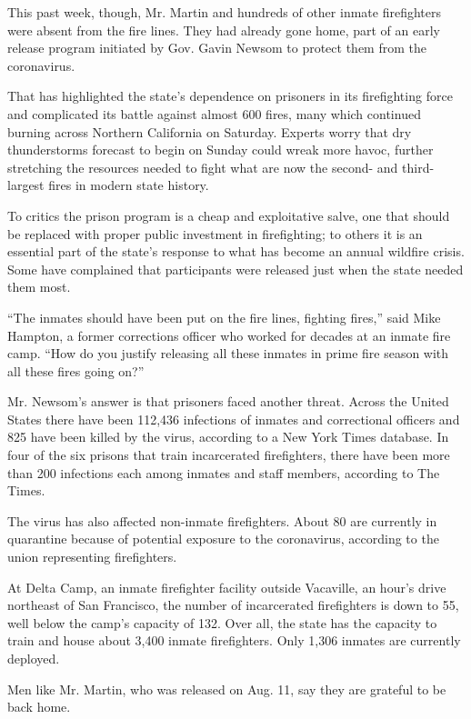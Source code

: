 This past week, though, Mr. Martin and hundreds of other inmate
firefighters were absent from the fire lines. They had already gone
home, part of an early release program initiated by Gov. Gavin Newsom to
protect them from the coronavirus.

That has highlighted the state's dependence on prisoners in its
firefighting force and complicated its battle against almost 600 fires,
many which continued burning across Northern California on Saturday.
Experts worry that dry thunderstorms forecast to begin on Sunday could
wreak more havoc, further stretching the resources needed to fight what
are now the second- and third-largest fires in modern state history.

To critics the prison program is a cheap and exploitative salve, one
that should be replaced with proper public investment in firefighting;
to others it is an essential part of the state's response to what has
become an annual wildfire crisis. Some have complained that participants
were released just when the state needed them most.

``The inmates should have been put on the fire lines, fighting fires,''
said Mike Hampton, a former corrections officer who worked for decades
at an inmate fire camp. ``How do you justify releasing all these inmates
in prime fire season with all these fires going on?''

Mr. Newsom's answer is that prisoners faced another threat. Across the
United States there have been 112,436 infections of inmates and
correctional officers and 825 have been killed by the virus, according
to a New York Times database. In four of the six prisons that train
incarcerated firefighters, there have been more than 200 infections each
among inmates and staff members, according to The Times.

The virus has also affected non-inmate firefighters. About 80 are
currently in quarantine because of potential exposure to the
coronavirus, according to the union representing firefighters.

At Delta Camp, an inmate firefighter facility outside Vacaville, an
hour's drive northeast of San Francisco, the number of incarcerated
firefighters is down to 55, well below the camp's capacity of 132. Over
all, the state has the capacity to train and house about 3,400 inmate
firefighters. Only 1,306 inmates are currently deployed.

Men like Mr. Martin, who was released on Aug. 11, say they are grateful
to be back home.

